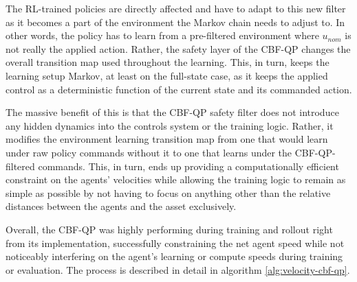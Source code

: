 The RL-trained policies are directly affected and have to adapt to this new filter as it becomes a part of the environment the Markov chain needs to adjust to. In other words, the policy has to learn from a pre-filtered environment where $u_{nom}$ is not really the applied action. Rather, the safety layer of the CBF-QP changes the overall transition map used throughout the learning. This, in turn, keeps the learning setup Markov, at least on the full-state case, as it keeps the applied control as a deterministic function of the current state and its commanded action. 

The massive benefit of this is that the CBF-QP safety filter does not introduce any hidden dynamics into the controls system or the training logic. Rather, it modifies the environment learning transition map from one that would learn under raw policy commands without it to one that learns under the CBF-QP-filtered commands. This, in turn, ends up providing a computationally efficient constraint on the agents' velocities while allowing the training logic to remain as simple as possible by not having to focus on anything other than the relative distances between the agents and the asset exclusively.

 Overall, the CBF-QP was highly performing during training and rollout right from its implementation, successfully constraining the net agent speed while not noticeably interfering on the agent's learning or compute speeds during training or evaluation. The process is described in detail in algorithm \ref{alg:velocity-cbf-qp}.



